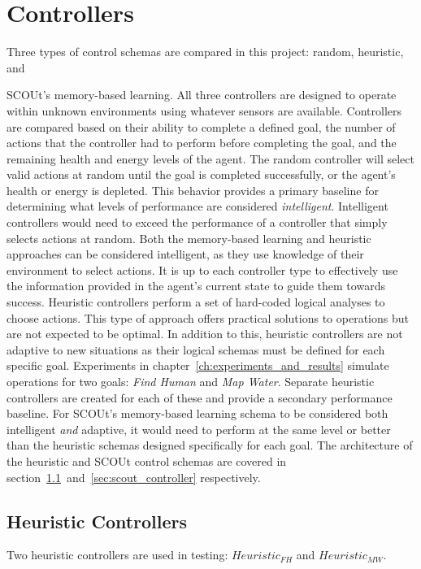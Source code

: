 
\chapter{Controllers} \label{ch:controllers}
Three types of control schemas are compared in this project: random, heuristic, and

\noindent
SCOUt's memory-based learning.
All three controllers are designed to operate within unknown environments using whatever sensors are available.
Controllers are compared based on their ability to complete a defined goal, the number of actions that the controller had to perform before completing the goal, and the remaining health and energy levels of the agent.
The random controller will select valid actions at random until the goal is completed successfully, or the agent's health or energy is depleted.
This behavior provides a primary baseline for determining what levels of performance are considered \textit{intelligent}.
Intelligent controllers would need to exceed the performance of a controller that simply selects actions at random.
Both the memory-based learning and heuristic approaches can be considered intelligent, as they use knowledge of their environment to select actions.
It is up to each controller type to effectively use the information provided in the agent's current state to guide them towards success.
Heuristic controllers perform a set of hard-coded logical analyses to choose actions.
This type of approach offers practical solutions to operations but are not expected to be optimal.
In addition to this, heuristic controllers are not adaptive to new situations as their logical schemas must be defined for each specific goal.
Experiments in chapter~\ref{ch:experiments_and_results} simulate operations for two goals: \textit{Find Human} and \textit{Map Water}.
Separate heuristic controllers are created for each of these and provide a secondary performance baseline.
For SCOUt's memory-based learning schema to be considered both intelligent \textit{and} adaptive, it would need to perform at the same level or better than the heuristic schemas designed specifically for each goal.
The architecture of the heuristic and SCOUt control schemas are covered in section~\ref{sec:heuristic_controllers}~and~\ref{sec:scout_controller} respectively.


\section{Heuristic Controllers} \label{sec:heuristic_controllers}
Two heuristic controllers are used in testing: $Heuristic_{FH}$ and $Heuristic_{MW}$.

